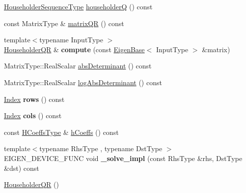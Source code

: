 \begin{DoxyCompactItemize}
\item 
\hyperlink{group___householder___module_class_eigen_1_1_householder_sequence}{Householder\+Sequence\+Type} \hyperlink{group___q_r___module_affd506c10ef2d25f56e7b1f9f25ff885}{householderQ} () const
\item 
const Matrix\+Type \& \hyperlink{group___q_r___module_ae837f2fb30099212c53b3042c7d699c9}{matrix\+QR} () const
\item 
\mbox{\label{group___q_r___module_aa8c555a962ee6fc24387696980d3068b}} 
{\footnotesize template$<$typename Input\+Type $>$ }\\\hyperlink{group___q_r___module_class_eigen_1_1_householder_q_r}{Householder\+QR} \& {\bfseries compute} (const \hyperlink{group___core___module_struct_eigen_1_1_eigen_base}{Eigen\+Base}$<$ Input\+Type $>$ \&matrix)
\item 
Matrix\+Type\+::\+Real\+Scalar \hyperlink{group___q_r___module_aaf4ef26c0b7affc91431ec59c92d64c3}{abs\+Determinant} () const
\item 
Matrix\+Type\+::\+Real\+Scalar \hyperlink{group___q_r___module_af61b6dbef34fc51c825182b16dc43ca1}{log\+Abs\+Determinant} () const
\item 
\mbox{\label{group___q_r___module_aa5d8f6ec5fbedfdf0ec0d02459981e69}} 
\hyperlink{namespace_eigen_a62e77e0933482dafde8fe197d9a2cfde}{Index} {\bfseries rows} () const
\item 
\mbox{\label{group___q_r___module_a2cd92da5485f0c4b79f39d7503e5c3f7}} 
\hyperlink{namespace_eigen_a62e77e0933482dafde8fe197d9a2cfde}{Index} {\bfseries cols} () const
\item 
const \hyperlink{class_eigen_1_1internal_1_1_tensor_lazy_evaluator_writable}{H\+Coeffs\+Type} \& \hyperlink{group___q_r___module_ae931aa44cde62317b57a9ae661d184be}{h\+Coeffs} () const
\item 
\mbox{\label{group___q_r___module_a33e033839ef123abf9768a686678abc0}} 
{\footnotesize template$<$typename Rhs\+Type , typename Dst\+Type $>$ }\\E\+I\+G\+E\+N\+\_\+\+D\+E\+V\+I\+C\+E\+\_\+\+F\+U\+NC void {\bfseries \+\_\+solve\+\_\+impl} (const Rhs\+Type \&rhs, Dst\+Type \&dst) const
\item 
\hyperlink{group___q_r___module_a974adb10a0e066057aeb3b360df68380}{Householder\+QR} ()

\end{DoxyCompactItemize}
